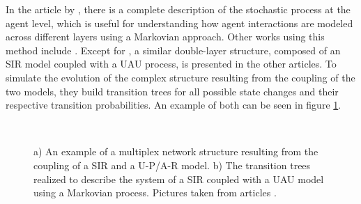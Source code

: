 In the article by \cite{Sahneh2013}, there is a complete description of the stochastic process at the agent level, which is useful for understanding how agent interactions are modeled across different layers using a Markovian approach. Other works using this method include \cite{Silva2019, Frieswijk_2022, Peng2021, Zuo_2021}. Except for \cite{Frieswijk_2022}, a similar double-layer structure, composed of an SIR model coupled with a UAU process, is presented in the other articles. To simulate the evolution of the complex structure resulting from the coupling of the two models, they build transition trees for all possible state changes and their respective transition probabilities. An example of both can be seen in figure \ref{fig:sir_example3}.  

\begin{figure}[h]
	\centering
	 \quad
	 \\
	\caption[Multiplex networks]{a) An example of a multiplex network structure resulting from the coupling of a SIR and a U-P/A-R model. b) The transition trees realized to describe the system of a SIR coupled  with a UAU model using a Markovian process. Pictures taken from articles \cite{Peng2021, Silva2019}.}
	\label{fig:sir_example3}
\end{figure}

